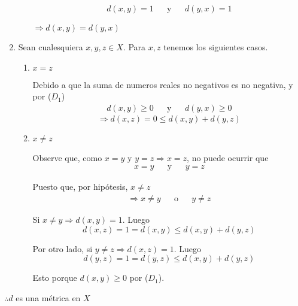 \begin{proofexplanation}
\begin{enumerate}[label=(\subscript{D}{{\arabic*}})]
\begin{enumerate}
        \begin{align*}
        d(x,y)=1 & & \text{y} & & d(y,x) =1
        \end{align*}

        $\Rightarrow d(x,y) = d(y,x)$
    \end{enumerate}
    \item Sean cualesquiera $x,y,z \in X$. Para $x,z$ tenemos los siguientes casos.
    \begin{enumerate}
        \item $x=z$

        Debido a que la suma de numeros reales no negativos es no negativa, y por ($D_1$)
        \begin{align*}
        d(x,y) \geqslant 0 & & \text{y} & & d(y,x) \geqslant 0
        \end{align*}
        \begin{equation*}
            \Rightarrow d(x,z) = 0 \leqslant d(x,y) + d(y,z)
        \end{equation*}
        
        \item $x\neq z$

        Observe que, como $x=y$ y $y=z \Rightarrow x=z$, no puede ocurrir que
        \begin{align*}
        x=y & & \text{y} & & y=z
        \end{align*}

        Puesto que, por hipótesis, $x \neq z$
        \begin{align*}
        \Rightarrow x\neq y & & \text{o} & & y \neq z
        \end{align*}

        Si $x\neq y \Rightarrow d(x,y) = 1$. Luego
        \begin{equation*}
            d(x,z) = 1 = d(x,y) \leqslant d(x,y) + d(y,z)
        \end{equation*}

        Por otro lado, si  $y \neq z \Rightarrow d(x,z) = 1$. Luego
        \begin{equation*}
            d(y,z) = 1 = d(y,z) \leqslant d(x,y) + d(y,z)
        \end{equation*}

        Esto porque $d(x,y) \geqslant 0 $ por ($D_1$).

        
        

    \end{enumerate}
    \end{enumerate}
    $\therefore d$ es una métrica en $X$
\end{proofexplanation}

